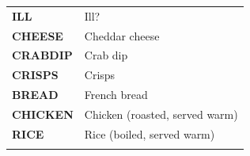 \documentclass[12pt,a4paper]{book}
\theoremstyle{definition}
\theoremstyle{definition}
\theoremstyle{definition}
\theoremstyle{remark}
\begin{document}
\begin{longtable}[]{@{}ll@{}}
\toprule
\begin{minipage}[t]{0.21\columnwidth}\raggedright
\textbf{ILL}\strut
\end{minipage} & \begin{minipage}[t]{0.44\columnwidth}\raggedright
Ill?\strut
\end{minipage}\tabularnewline
\begin{minipage}[t]{0.21\columnwidth}\raggedright
\textbf{CHEESE}\strut
\end{minipage} & \begin{minipage}[t]{0.44\columnwidth}\raggedright
Cheddar cheese\strut
\end{minipage}\tabularnewline
\begin{minipage}[t]{0.21\columnwidth}\raggedright
\textbf{CRABDIP}\strut
\end{minipage} & \begin{minipage}[t]{0.44\columnwidth}\raggedright
Crab dip\strut
\end{minipage}\tabularnewline
\begin{minipage}[t]{0.21\columnwidth}\raggedright
\textbf{CRISPS}\strut
\end{minipage} & \begin{minipage}[t]{0.44\columnwidth}\raggedright
Crisps\strut
\end{minipage}\tabularnewline
\begin{minipage}[t]{0.21\columnwidth}\raggedright
\textbf{BREAD}\strut
\end{minipage} & \begin{minipage}[t]{0.44\columnwidth}\raggedright
French bread\strut
\end{minipage}\tabularnewline
\begin{minipage}[t]{0.21\columnwidth}\raggedright
\textbf{CHICKEN}\strut
\end{minipage} & \begin{minipage}[t]{0.44\columnwidth}\raggedright
Chicken (roasted, served warm)\strut
\end{minipage}\tabularnewline
\begin{minipage}[t]{0.21\columnwidth}\raggedright
\textbf{RICE}\strut
\end{minipage} & \begin{minipage}[t]{0.44\columnwidth}\raggedright
Rice (boiled, served warm)\strut
\end{minipage}\tabularnewline
\begin{minipage}[t]{0.21\columnwidth}\raggedright

\end{minipage}
\end{longtable}
\end{document}

